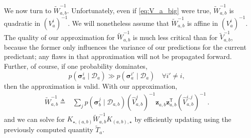 \documentclass{article}
\newcommand{\given}{\ensuremath{\mid}}
\newcommand{\cm}[1]{\ensuremath{\mathcal{#1}}}
\newcommand{\bm}[1]{\ensuremath{\mathbf{#1}}}
\newcommand{\data}{\ensuremath{\cm{D}}}
\newcommand{\vect}[1]{\bm{#1}}
\newcommand{\vz}{\vect{z}}
\newcommand{\vs}{\vect{\sigma}}
\newcommand{\fPr}{p}
\newcommand{\Prob}[2]{\fPr(#1 \given #2 )}
\newcommand{\tr}{\ensuremath{\mathsf{T}}}
\newcommand{\defequal}{\triangleq}
\begin{document}
We now turn to $\tilde{W}_{a,b}^{-1}$. Unfortunately, even if
\eqref{eq:V_a_big} were true, $\tilde{W}_{a,b}^{-1}$ is quadratic in
$(V^i_a)^{-1}$. We will nonetheless assume that $\tilde{W}_{a,b}^{-1}$
is affine in $(V^i_a)^{-1}$. The quality of our approximation for
$\tilde{W}_{a,b}^{-1}$ is much less critical than for
$\tilde{V}^{-1}_{a,b}$, because the former only influences the
variance of our predictions for the current predictant; any flaws in
that approximation will not be propagated forward. Further, of course,
if one probability dominates, 
\begin{equation*}
\Prob{\vs^i_{a}}{\data_{a}}\gg
\Prob{\vs^{i'}_{a}}{\data_{a}} \quad \forall i' \neq i,
\end{equation*} 
then the approximation is valid. With our approximation,
\begin{align}
\tilde{W}^{-1}_{a,b} \defequal
& \sum_{j} \Prob{\vs^j_{b}}{\data_{a,b}} (\hat{V}_{a,b}^{j})^{-1}\vz_{a,b}^{\phantom{\tr}} \vz_{a,b}^\tr (\hat{V}_{a,b}^{i,j})^{-1}\,.\label{eq:Wab}
\end{align}
and we can solve for
$K_{\star,(a,b)}\tilde{W}^{-1}_{a,b}K_{(a,b),\star}$ by efficiently
updating using the previously computed quantity $\tilde{T}_{a}$.
\end{document}

